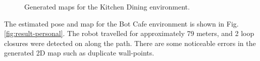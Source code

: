 \documentclass[10pt,journal,compsoc]{IEEEtran}
\begin{document}
\begin{figure}[thpb]
      \centering
      \vfill
      \caption{Generated maps for the Kitchen Dining environment.}
      \label{fig:result-supplied}
\end{figure}

The estimated pose and map for the Bot Cafe environment is shown in Fig. \ref{fig:result-personal}. The robot travelled for approximately 79 meters, and 2 loop closures were detected on along the path. There are some noticeable errors in the generated 2D map such as duplicate wall-points.
\end{document}
